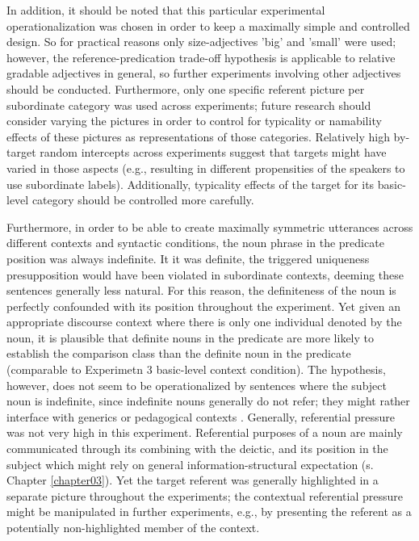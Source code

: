 In addition, it should be noted that this particular experimental operationalization was chosen in order to keep a maximally simple and controlled design. So for practical reasons only size-adjectives 'big' and 'small' were used; however, the reference-predication trade-off hypothesis is applicable to relative gradable adjectives in general, so further experiments involving other adjectives should be conducted. Furthermore, only one specific referent picture per subordinate category was used across experiments; future research should consider varying the pictures in order to control for typicality or namability effects of these pictures as representations of those categories. Relatively high by-target random intercepts across experiments suggest that targets might have varied in those aspects (e.g., resulting in different propensities of the speakers to use subordinate labels). Additionally, typicality effects of the target for its basic-level category should be controlled more carefully. 

Furthermore, in order to be able to create maximally symmetric utterances across different contexts and syntactic conditions, the noun phrase in the predicate position was always indefinite. It it was definite, the triggered uniqueness presupposition would have been violated in subordinate contexts, deeming these sentences generally less natural. 
For this reason, the definiteness of the noun is perfectly confounded with its position throughout the experiment. Yet given an appropriate discourse context where there is only one individual denoted by the noun, it is plausible that definite nouns in the predicate are more likely to establish the comparison class than the definite noun in the predicate (comparable to Experimetn 3 basic-level context condition). The hypothesis, however, does not seem to be operationalized by sentences where the subject noun is indefinite, since indefinite nouns generally do not refer; they might rather interface with generics or pedagogical contexts \parencite{Reboul2001, tessler2019language}. 
 Generally, referential pressure was not very high in this experiment. Referential purposes of a noun are mainly communicated through its combining with the deictic, and its position in the subject which might rely on general information-structural expectation (s. Chapter \ref{chapter03}). Yet the target referent was generally highlighted in a separate picture throughout the experiments; the contextual referential pressure might be manipulated in further experiments, e.g., by presenting the referent as a potentially non-highlighted member of the context. 

